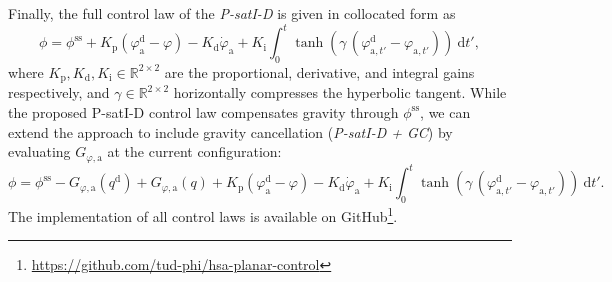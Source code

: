 % 
Finally, the full control law of the \emph{P-satI-D} is given in collocated form as
\begin{equation}\label{eq:hsacontrol:gravity_compensation_controller}
    \phi = \phi^\mathrm{ss} + K_\mathrm{p} (\varphi_\mathrm{a}^\mathrm{d} - \varphi) - K_\mathrm{d} \dot{\varphi}_\mathrm{a} + K_\mathrm{i} \int_0^t \tanh(\gamma \, ( \varphi_{\mathrm{a},t'}^\mathrm{d}-\varphi_{\mathrm{a},t'})) \: \mathrm{d} t',
\end{equation}
where $K_\mathrm{p}, K_\mathrm{d}, K_\mathrm{i} \in \mathbb{R}^{2 \times 2}$ are the proportional, derivative, and integral gains respectively, and $\gamma \in \mathbb{R}^{2 \times 2}$ horizontally compresses the hyperbolic tangent. While the proposed P-satI-D control law compensates gravity through $\phi^\mathrm{ss}$, we can extend the approach to include gravity cancellation (\emph{P-satI-D + GC}) by evaluating $G_{\varphi,\mathrm{a}}$ at the current configuration:
\begin{equation}\label{eq:hsacontrol:gravity_cancellation_controller}
    \phi = \phi^\mathrm{ss} - G_{\varphi,\mathrm{a}}(q^\mathrm{d}) + G_{\varphi,\mathrm{a}}(q) + K_\mathrm{p} (\varphi_\mathrm{a}^\mathrm{d} - \varphi) - K_\mathrm{d} \dot{\varphi}_\mathrm{a} + K_\mathrm{i} \int_0^t \tanh(\gamma \, ( \varphi_{\mathrm{a},t'}^\mathrm{d}-\varphi_{\mathrm{a},t'})) \: \mathrm{d} t'.
\end{equation}
The implementation of all control laws is available on GitHub\footnote{\url{https://github.com/tud-phi/hsa-planar-control}}.